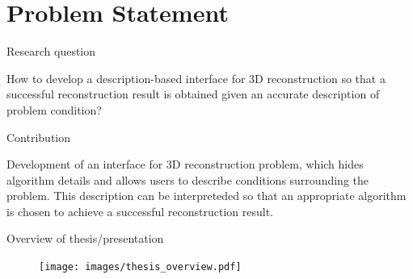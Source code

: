 \documentclass[10pt]{beamer}
\begin{document}
\section{Problem Statement} %

\begin{frame}{Research question}

How to develop a description-based interface for 3D reconstruction so that a successful reconstruction result is obtained given an accurate description of problem condition?

\end{frame}

\begin{frame}{Contribution}

Development of an interface for 3D reconstruction problem, which hides algorithm details and allows users to describe conditions surrounding the problem. This description can be interpreteded so that an appropriate algorithm is chosen to achieve a successful reconstruction result.


\end{frame}

\begin{frame}{Overview of thesis/presentation}

\begin{figure}
\centering
\texttt{[image: images/thesis\_overview.pdf]}
\end{figure}

\end{frame}

\end{document}
